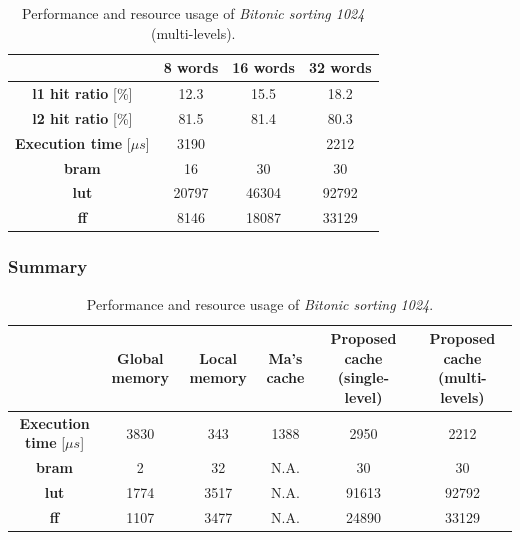 \documentclass[11pt,a4paper,oneside]{memoir}
\begin{document}
\begin{table}[H]
	\begin{center}
		\begin{tabular}{cccc}
			\hline
			\rowcolor{gray!50}
			& \textbf{8 words} & \textbf{16 words} & \textbf{32 words} \\
			\hline
			\textbf{\ac{l1} hit ratio} [\%] & 12.3 & 15.5 & 18.2 \\
			\rowcolor{gray!25}
			\textbf{\ac{l2} hit ratio} [\%] & 81.5 & 81.4 & 80.3 \\
			\textbf{Execution time} [$\mu s$] & 3190 & & 2212 \\
			\rowcolor{gray!25}
			\textbf{\ac{bram}} & 16 & 30 & 30 \\
			\textbf{\acs{lut}} & 20797 & 46304 & 92792 \\
			\rowcolor{gray!25}
			\textbf{\acs{ff}} & 8146 & 18087 & 33129 \\
			\hline
		\end{tabular}
	\end{center}
	\caption{Performance and resource usage of \emph{Bitonic sorting 1024} (multi-levels).}
	\label{tab:bitonic_1024_l1_report}
\end{table}

\subsubsection{Summary}
\begin{table}[H]
	\begin{center}
		\begin{tabularx}{\textwidth}{CCCCCC}
			\hline
			& \textbf{Global memory} & \textbf{Local memory} &
			\textbf{Ma's cache} \footnotemark &
			\textbf{Proposed cache (single-level)} &
			\textbf{Proposed cache (multi-levels)} \\
			\hline
			\textbf{Execution time} [$\mu s$] & 3830 & 343 & 1388 & 2950 & 2212 \\
			\textbf{\ac{bram}} & 2 & 32 & N.A. & 30 & 30 \\
			\textbf{\acs{lut}} & 1774 & 3517 & N.A. & 91613 & 92792 \\
			\textbf{\acs{ff}} & 1107 & 3477 & N.A. & 24890 & 33129 \\
			\hline
		\end{tabularx}
	\end{center}
	\caption{Performance and resource usage of \emph{Bitonic sorting 1024}.}
	\label{tab:bitonic_1024_report}
\end{table}
\end{document}
